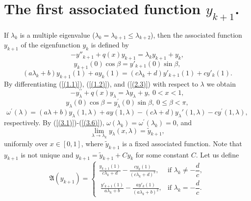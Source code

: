 \documentclass[pdflatex,sn-mathphys-num]{sn-jnl}%
\theoremstyle{thmstyleone}%
\theoremstyle{thmstyletwo}%
\theoremstyle{thmstylethree}%
\theoremstyle{definition}
\theoremstyle{remark}
\numberwithin{equation}{section}
\begin{document}
\section{The first associated function \(y_{k + 1}\).}
If \(\lambda_{k}\) is a multiple  eigenvalue
(\(\lambda_{k} = \lambda_{k + 1}\le\lambda_{k + 2}\)), then the associated function
\(y_{k + 1}\) of the eigenfunction \(y_{k}\) is defined by
\begin{equation}
    {- y''_{k + 1}} + q(x)y_{k + 1} = \lambda_{k}y_{k + 1} + y_{k}, \label{(3.1)}
\end{equation}
\begin{equation}
y_{k + 1}(0)\cos\beta = y'_{k + 1}(0)\sin\beta, \label{(3.2)}
\end{equation}
\begin{equation}
\left( a\lambda_{k} + b \right)y_{k + 1}(1) + ay_{k}(1) = \left( c\lambda_{k} + d \right)y'_{k + 1}(1) + cy'_{k}(1). \label{(3.3)}
\end{equation}
By differentiating (\ref{(1.1)}), (\ref{(1.2)}), and (\ref{(2.3)}) with respect to $\lambda$ we obtain 
\begin{equation}
  -y_\lambda^{\prime \prime }+q(x)y_\lambda=\lambda y_\lambda+y,\ 0<x<1,  \label{(3.4)} 
\end{equation}
\begin{equation}
y_\lambda(0)\cos \beta =y_\lambda^{\prime }(0)\sin \beta ,\ 0\leq \beta <\pi ,
\label{(3.5)}
\end{equation}
\begin{equation}
 \omega^\prime(\lambda) = (a\lambda + b)y_\lambda(1,\lambda)+ay(1,\lambda) - (c\lambda + d)y_\lambda{'}(1,\lambda)-cy^\prime(1,\lambda), \label{(3.6)}   
\end{equation}
respectively. By (\ref{(3.1)})-(\ref{(3.6)}), \(\omega(\lambda_k)=\omega^\prime(\lambda_k)=0\), and $$\lim_{\lambda\to\lambda_k}y_\lambda(x,\lambda)=\tilde{y}_{k+1},$$uniformly over $x\in[0,1]$, where $\tilde{y}_{k+1}$ is a fixed associated function. Note that $y_{k + 1}$ is not unique and $y_{k + 1}=\tilde{y}_{k+1}+Cy_k$ for some constant $C$.
Let us define 
\begin{equation}
\mathfrak{A}(y_{k+1}) =
\begin{cases}
\displaystyle  
\frac{y_{k + 1}(1)}{c\lambda_{k}+d} - \frac{cy_{k}(1)}{{(c\lambda_{k}+d)}^{2}}, 
& \text{if } \lambda_k \neq -\dfrac{d}{c}, \\[10pt]
\displaystyle \ 
\frac{y'_{k + 1}(1)}{a\lambda_{k}+b} - \frac{ay'_{k}(1)}{{(a\lambda_{k}+b)}^{2}}, 
& \text{if } \lambda_k = -\dfrac{d}{c}.
\end{cases}\label{(3.7)}
\end{equation}
\end{document}
